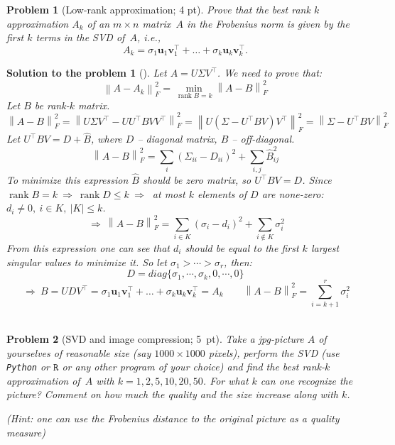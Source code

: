 \documentclass[12pt,a4]{article}
\newtheorem{problem}{Problem}
\newtheorem{solution}{Solution to the problem}
\newcommand\rank{\operatorname{rank}}
\newcommand{\trace}{\operatorname{tr}}
\newcommand{\bu}{{\mathbf u}}
\newcommand{\bv}{{\mathbf v}}
\newcommand{\norm}[1]{\left\lVert#1\right\rVert}
\begin{document}
\begin{problem}[Low-rank approximation; 4 pt]\label{prb:13.5}\rm
Prove that the best rank $k$ approximation $A_k$ of an $m\times n$ matrix~$A$ in the Frobenius norm is given by the first $k$ terms in the SVD of~$A$, i.e., 
\[
	A_k = \sigma_1\bu_1\bv_1^\top + \dots + \sigma_k \bu_k\bv_k^\top.
\]
\end{problem}

\begin{solution}[] \rm Let $A=U\Sigma V^\top$. We need to prove that:
\[
\norm{A-A_k}_F^2 = \min_{\rank B = k}\norm{A-B}_F^2
\]
Let $B$ be rank-$k$ matrix.
\[
\norm{A-B}^2_F = \norm{U\Sigma V^\top - U U^\top B V V^\top}^2_F = \norm{U(\Sigma - U^\top B V) V^\top}^2_F = \norm{\Sigma - U^\top B V}^2_F
\]
Let $U^\top B V = D + \hat B$, where $D$ -- diagonal matrix, $\hat B$ -- off-diagonal.
\[
\norm{A-B}^2_F = \sum_i{(\Sigma_{ii} - D_{ii})^2} + \sum_{i,j}{\hat B_{ij}^2}
\]
To minimize this expression $\hat B$ should be zero matrix, so $U^\top B V = D$. Since $\rank B = k ~\Rightarrow~ \rank D \leq k ~\Rightarrow~ $ at most $k$ elements of $D$ are none-zero: $d_i \neq 0, ~i \in K, ~|K|\leq k$.
\[
~\Rightarrow~ \norm{A-B}^2_F = \sum_{i\in K}{(\sigma_{i} - d_{i})^2} + \sum_{i\notin K}{\sigma_{i}^2}
\]
From this expression one can see that $d_i$ should be equal to the first $k$ largest singular values to minimize it. So let $\sigma_1 > \cdots > \sigma_r$, then:
\[
D = diag\{\sigma_1, \cdots, \sigma_k, 0, \cdots, 0\}
\]
\[
~\Rightarrow~
B = U D V^\top = \sigma_1\bu_1\bv_1^\top + \dots + \sigma_k \bu_k\bv_k^\top = A_k
\qquad
\norm{A-B}_F^2 = \sum_{i=k+1}^r \sigma_i^2
\]\\
\end{solution}


\begin{problem}[SVD and image compression; 5~pt]\rm
	Take a jpg-picture $A$ of yourselves of reasonable size (say $1000\times 1000$ pixels), perform the SVD (use \texttt{Python} or $\texttt{R}$ or any other program of your choice) and find the best rank-$k$ approximation of~$A$ with $k=1,2,5,10,20,50$. For what $k$ can one recognize the picture? Comment on how much the quality and the size increase along with $k$.
	
	(\small{\textsf{Hint: one can use the Frobenius distance to the original picture as a quality measure}})
\end{problem}
\end{document}
